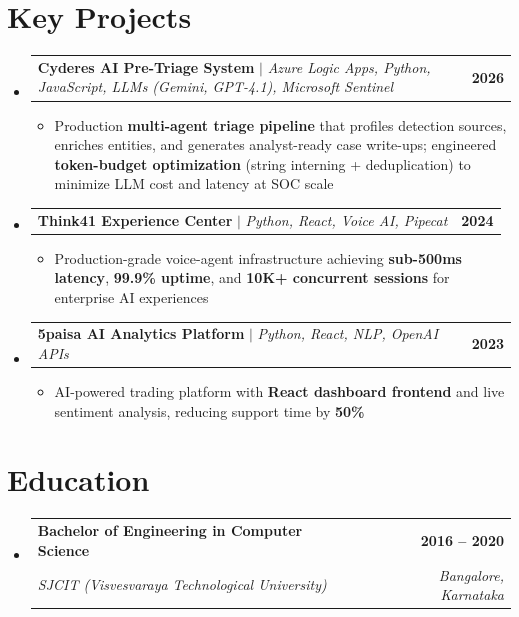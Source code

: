 \documentclass[letterpaper,8.5pt]{article}
\makeatletter
\newcommand{\resumeItem}[1]{
  \item\small{
    {#1 \vspace{-1pt}}
  }
}
\newcommand{\resumeSubheading}[4]{
  \vspace{-1pt}\item
    \begin{tabular*}{1.0\textwidth}[t]{l@{\extracolsep{\fill}}r}
      \textbf{#1} & \textbf{\small #2} \\
      \textit{\small#3} & \textit{\small #4} \\
    \end{tabular*}\vspace{-6pt}
}
\newcommand{\resumeProjectHeading}[2]{
    \item
    \begin{tabular*}{1.001\textwidth}{l@{\extracolsep{\fill}}r}
      \small#1 & \textbf{\small #2}\\
    \end{tabular*}\vspace{-6pt}
}
\newcommand{\resumeSubHeadingListStart}{\begin{itemize}[leftmargin=0.0in, label={}]}
\newcommand{\resumeSubHeadingListEnd}{\end{itemize}}
\newcommand{\resumeItemListStart}{\begin{itemize}[leftmargin=0.10in]}
\newcommand{\resumeItemListEnd}{\end{itemize}\vspace{-4pt}}
\makeatother
\begin{document}
\section{Key Projects}
    \resumeSubHeadingListStart
      \resumeProjectHeading
          {\textbf{Cyderes AI Pre-Triage System} $|$ \emph{Azure Logic Apps, Python, JavaScript, LLMs (Gemini, GPT-4.1), Microsoft Sentinel}}{2026}
          \resumeItemListStart
            \resumeItem{Production \textbf{multi-agent triage pipeline} that profiles detection sources, enriches entities, and generates analyst-ready case write-ups; engineered \textbf{token-budget optimization} (string interning + deduplication) to minimize LLM cost and latency at SOC scale}
          \resumeItemListEnd
          \vspace{-9pt}
      \resumeProjectHeading
          {\textbf{Think41 Experience Center} $|$ \emph{Python, React, Voice AI, Pipecat}}{2024}
          \resumeItemListStart
            \resumeItem{Production-grade voice-agent infrastructure achieving \textbf{sub-500ms latency}, \textbf{99.9\% uptime}, and \textbf{10K+ concurrent sessions} for enterprise AI experiences}
          \resumeItemListEnd
          \vspace{-9pt}
      \resumeProjectHeading
          {\textbf{5paisa AI Analytics Platform} $|$ \emph{Python, React, NLP, OpenAI APIs}}{2023}
          \resumeItemListStart
            \resumeItem{AI-powered trading platform with \textbf{React dashboard frontend} and live sentiment analysis, reducing support time by \textbf{50\%}}
          \resumeItemListEnd
    \resumeSubHeadingListEnd
\vspace{-8pt}
\section{Education}
  \resumeSubHeadingListStart
    \resumeSubheading
      {Bachelor of Engineering in Computer Science}{2016 -- 2020}
      {SJCIT (Visvesvaraya Technological University)}{Bangalore, Karnataka}
  \resumeSubHeadingListEnd
\end{document}
